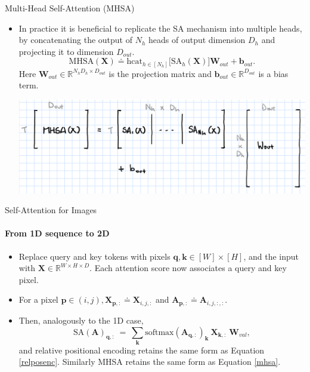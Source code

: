 \documentclass[9pt]{beamer}
\newcommand{\bb}{\mathbb}
\newcommand{\mb}{\bm}
\begin{document}
\begin{frame}{Multi-Head Self-Attention (MHSA)}
\begin{itemize}
\item In practice it is beneficial to replicate the SA mechanism into multiple heads, by concatenating the output of $N_h$ heads of output dimension $D_h$ and projecting it to dimension $D_{out}$.
\begin{equation}
\mathrm{MHSA}(\mb X) \doteq \mathrm{hcat}_{h\in[N_h]}\big[\mathrm{SA}_h(\mb X)\big]\mb W_{out} + \mb b_{out}. \label{mhsa}
\end{equation}
Here $\bm W_{out}\in\bb R^{N_hD_h\times D_{out}}$ is the projection matrix and $\bm  b_{out}\in\bb R^{D_{out}}$ is a bias term.

\vspace{.2in}
\begin{center}
    \includegraphics[width=.7\textwidth]{images/mhsa.png}
\end{center}
\end{itemize}
\end{frame}


\begin{frame}{Self-Attention for Images}
\framesubtitle{From 1D sequence to 2D}
\begin{itemize}
\item Replace query and key tokens with pixels $\bm q, \bm k \in [W]\times[H]$, and the input with $\bm X \in \bb R^{W\times H\times D}$. Each attention score now associates a query and key pixel. 

\item For a pixel $\bm p\in (i,j), \bm X_{\bm p,:} \doteq \bm X_{i,j,:}$ and $\bm A_{\bm p, :} \doteq \bm A_{i,j,:,:}$. 

\item Then, analogously to the 1D case,
\begin{equation}
\mathrm{SA}(\mb A)_{\mb q, :} \ = \ \sum_{\mb k} \mathrm{softmax}(\mb A_{\mb q, :})_{\mb k}\ \mb X_{\mb k, :} \ \mb W_{val},
\end{equation}
and relative positional encoding retains the same form as Equation \eqref{relposenc}. Similarly MHSA retains the same form as Equation \eqref{mhsa}.
\end{itemize}
\end{frame}
\end{document}

